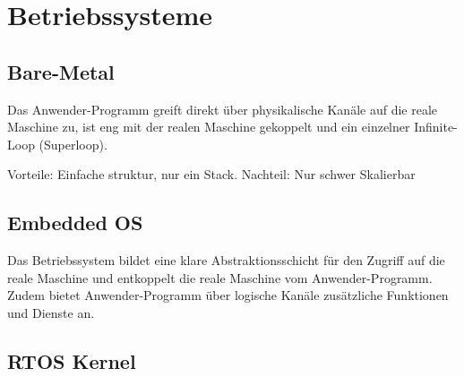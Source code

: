 \section{Betriebssysteme}
\subsection{Bare-Metal}
Das Anwender-Programm greift direkt über physikalische Kanäle auf die reale Maschine zu, ist eng mit der realen Maschine gekoppelt und ein einzelner Infinite-Loop (Superloop).

Vorteile: Einfache struktur, nur ein Stack.
Nachteil: Nur schwer Skalierbar

\subsection{Embedded OS}
Das Betriebssystem bildet eine klare Abstraktionsschicht für den Zugriff auf die reale Maschine und entkoppelt die reale Maschine vom Anwender-Programm. Zudem bietet Anwender-Programm über logische Kanäle zusätzliche Funktionen und Dienste an.

\subsection{RTOS Kernel}

